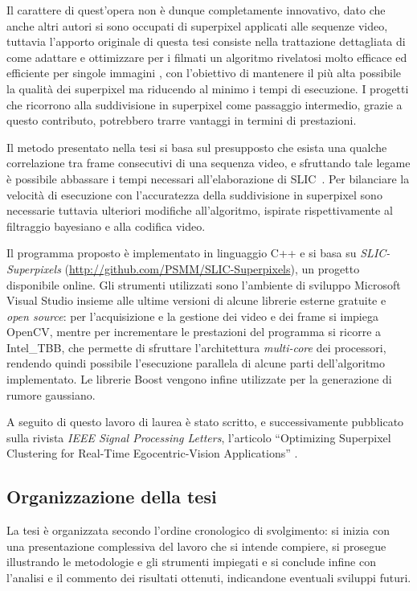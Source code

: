 \documentclass[12pt,a4paper,oneside]{article}
\begin{document}
Il carattere di quest'opera non è dunque completamente innovativo, dato che anche altri autori si sono occupati di superpixel applicati alle sequenze video, tuttavia l'apporto originale di questa tesi consiste nella trattazione dettagliata di come adattare e ottimizzare per i filmati un algoritmo rivelatosi molto efficace ed efficiente per singole immagini \cite{ACHANTA_SLIC}, con l'obiettivo di mantenere il più alta possibile la qualità dei superpixel ma riducendo al minimo i tempi di esecuzione. I progetti che ricorrono alla suddivisione in superpixel come passaggio intermedio, grazie a questo contributo, potrebbero trarre vantaggi in termini di prestazioni.

Il metodo presentato nella tesi si basa sul presupposto che esista una qualche correlazione tra frame consecutivi di una sequenza video, e sfruttando tale legame è possibile abbassare i tempi necessari all'elaborazione di \acrshort{SLIC}~\cite{ACHANTA_SLIC}. Per bilanciare la velocità di esecuzione con l'accuratezza della suddivisione in superpixel sono necessarie tuttavia ulteriori modifiche all'algoritmo, ispirate rispettivamente al filtraggio bayesiano e alla codifica video.

Il programma proposto è implementato in linguaggio \mbox{C++} e si basa su \textit{SLIC-Superpixels} (\url{http://github.com/PSMM/SLIC-Superpixels}), un progetto disponibile online. Gli strumenti utilizzati sono l'ambiente di sviluppo Microsoft Visual Studio insieme alle ultime versioni di alcune librerie esterne gratuite e \textit{open source}: per l'acquisizione e la gestione dei video e dei frame si impiega \gls{OpenCV}, mentre per incrementare le prestazioni del programma si ricorre a \gls{Intel_TBB}, che permette di sfruttare l'architettura \textit{multi-core} dei processori, rendendo quindi possibile l'esecuzione parallela di alcune parti dell'algoritmo implementato. Le librerie Boost vengono infine utilizzate per la generazione di rumore gaussiano.

A seguito di questo lavoro di laurea è stato scritto, e successivamente pubblicato sulla rivista \textit{IEEE Signal Processing Letters}, l'articolo ``Optimizing Superpixel Clustering for Real-Time
Egocentric-Vision Applications'' \cite{GEORGIU}.

\subsection{Organizzazione della tesi}
La tesi è organizzata secondo l'ordine cronologico di svolgimento: si inizia con una presentazione complessiva del lavoro che si intende compiere, si prosegue illustrando le metodologie e gli strumenti impiegati e si conclude infine con l'analisi e il commento dei risultati ottenuti, indicandone eventuali sviluppi futuri.
\end{document}
